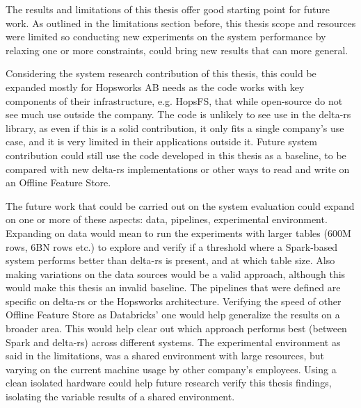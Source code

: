 The results and limitations of this thesis offer good starting point for future work. As outlined in the limitations section before, this thesis scope and resources were limited so conducting new experiments on the system performance by relaxing one or more constraints, could bring new results that can more general.

Considering the system research contribution of this thesis, this could be expanded mostly for Hopsworks \gls{AB} needs as the code works with key components of their infrastructure, e.g. \gls{HopsFS}, that while open-source do not see much use outside the company. The code is unlikely to see use in the delta-rs library, as even if this is a solid contribution, it only fits a single company's use case, and it is very limited in their applications outside it. Future system contribution could still use the code developed in this thesis as a baseline, to be compared with new delta-rs implementations or other ways to read and write on an Offline Feature Store.

The future work that could be carried out on the system evaluation could expand on one or more of these aspects: data, pipelines, experimental environment. Expanding on data would mean to run the experiments with larger tables (600M rows, 6BN rows etc.) to explore and verify if a threshold where a Spark-based system performs better than delta-rs is present, and at which table size. Also making variations on the data sources would be a valid approach, although this would make this thesis an invalid baseline. The pipelines that were defined are specific on delta-rs or the Hopsworks architecture. Verifying the speed of other Offline Feature Store as Databricks' one would help generalize the results on a broader area. This would help clear out which approach performs best (between Spark and delta-rs) across different systems.
The experimental environment as said in the limitations, was a shared environment with large resources, but varying on the current machine usage by other company's employees. Using a clean isolated hardware could help future research verify this thesis findings, isolating the variable results of a shared environment.